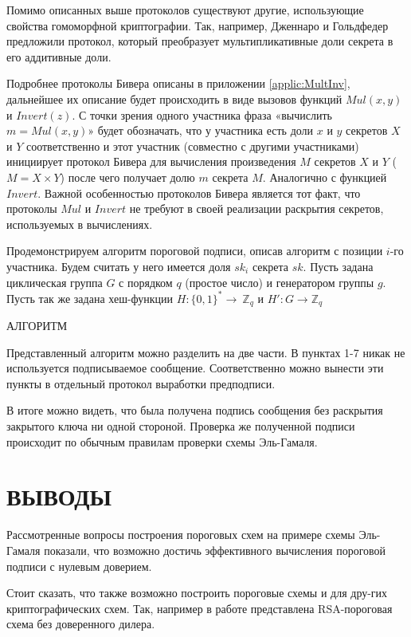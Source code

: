 \documentclass[a4paper,12pt]{article}
\theoremstyle{definition}
\begin{document}
		Помимо описанных выше протоколов существуют другие, использующие свойства гомоморфной криптографии. Так, например, Дженнаро и Гольдфедер предложили \cite{paper7} протокол, который преобразует мультипликативные доли секрета в его аддитивные доли.
		
		Подробнее протоколы Бивера описаны в приложении \ref{applic:MultInv}, дальнейшее их описание будет происходить в виде вызовов функций $Mul(x, y)$ и $Invert(z)$. С точки зрения одного участника фраза «вычислить $m=Mul(x, y)$» будет обозначать, что у участника есть доли $x$ и $y$ секретов $X$ и $Y$ соответственно и этот участник (совместно с другими участниками) инициирует протокол Бивера для вычисления произведения $M$ секретов $X$ и $Y$ ($M=X\times Y$) после чего получает долю $m$ секрета $M$. Аналогично с функцией $Invert$. Важной особенностью протоколов Бивера является тот факт, что протоколы $Mul$ и $Invert$ не требуют в своей реализации раскрытия секретов, используемых в вычислениях.
		
		Продемонстрируем алгоритм пороговой подписи, описав алгоритм с позиции $i$-го участника. Будем считать у него имеется доля $sk_i$ секрета $sk$. Пусть задана циклическая группа $G$ с порядком $q$ (простое число) и генератором группы $g$. Пусть так же задана хеш-функции $H: \{0,1\}^* \rightarrow~\mathbb{Z}_q$ и $H': G \rightarrow \mathbb{Z}_q$
		
		АЛГОРИТМ
		
		Представленный алгоритм можно разделить на две части. В пунктах 1-7 никак не используется подписываемое сообщение. Соответственно можно вынести эти пункты в отдельный протокол выработки предподписи.
		
		В итоге можно видеть, что была получена подпись сообщения без раскрытия закрытого ключа ни одной стороной. Проверка же полученной подписи происходит по обычным правилам проверки схемы Эль-Гамаля.
		


	\newpage
	\section*{ВЫВОДЫ}
	
	Рассмотренные вопросы построения пороговых схем на примере схемы Эль-Гамаля показали, что возможно достичь эффективного вычисления пороговой подписи с нулевым доверием. 
	
	Стоит сказать, что также возможно построить пороговые схемы и для дру-гих криптографических схем. Так, например в работе \cite{paper8} представлена RSA-пороговая схема без доверенного дилера. 
	
\end{document}
